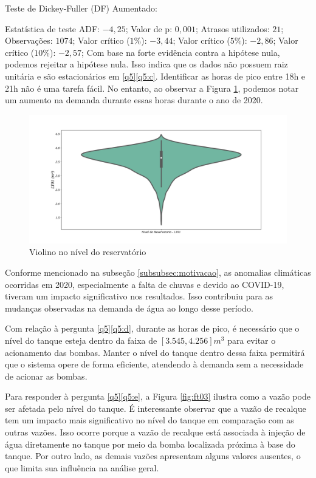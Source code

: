 Teste de Dickey-Fuller (DF) Aumentado:



Estatística de teste ADF: $-4,25$;
Valor de p: $0,001$;
Atrasos utilizados: $21$;
Observações: $1074$;
Valor crítico ($1\%$): $-3,44$;
Valor crítico ($5\%$): $-2,86$;
Valor crítico ($10\%$): $-2,57$;
Com base na forte evidência contra a hipótese nula, podemos rejeitar a hipótese nula. Isso indica que os dados não possuem raiz unitária e são estacionários em \ref{q5}\ref{q5:c}. Identificar as horas de pico entre 18h e 21h não é uma tarefa fácil. No entanto, ao observar a Figura \ref{fig:hist}, podemos notar um aumento na demanda durante essas horas durante o ano de 2020.
	
	
	\begin{figure}[H]
		\centering
		\caption{Violino no nível do reservatório}
		\label{fig:hist}
		\includegraphics[width=0.9\linewidth]{Resultados/Figuras/viol}
		
	\end{figure}
	
Conforme mencionado na subseção \ref{subsubsec:motivacao}, as anomalias climáticas ocorridas em 2020, especialmente a falta de chuvas e devido ao COVID-19, tiveram um impacto significativo nos resultados. Isso contribuiu para as mudanças observadas na demanda de água ao longo desse período.

Com relação à pergunta \ref{q5}\ref{q5:d}, durante as horas de pico, é necessário que o nível do tanque esteja dentro da faixa de $[3.545,4.256] m^3$ para evitar o acionamento das bombas. Manter o nível do tanque dentro dessa faixa permitirá que o sistema opere de forma eficiente, atendendo à demanda sem a necessidade de acionar as bombas.

Para responder à pergunta \ref{q5}\ref{q5:e}, a Figura \ref{fig:ft03} ilustra como a vazão pode ser afetada pelo nível do tanque. É interessante observar que a vazão de recalque tem um impacto mais significativo no nível do tanque em comparação com as outras vazões. Isso ocorre porque a vazão de recalque está associada à injeção de água diretamente no tanque por meio da bomba localizada próxima à base do tanque. Por outro lado, as demais vazões apresentam alguns valores ausentes, o que limita sua influência na análise geral.	
	

